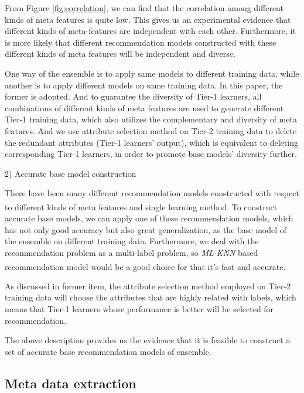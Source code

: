 \documentclass[review,3p,twocolumn,times]{elsarticle}
\newcommand{\upcite}[1]{\textsuperscript{\cite{#1}}}
\begin{document}
From Figure \ref{fig:correlation}, we can find that the correlation among different kinds of meta features is quite low. This gives us an experimental evidence that different kinds of meta-features are independent with each other. Furthermore, it is more likely that different recommendation models constructed with these different kinds of meta features will be independent and diverse.

One way of the ensemble is to apply same models to different training data, while another is to apply different models on same training data. In this paper, the former is adopted. And to guarantee the diversity of Tier-1 learners, all combinations of different kinds of meta features are used to generate different Tier-1 training data, which also utilizes the complementary and diversity of meta features. And we use attribute selection method on Tier-2 training data to delete the redundant attributes (Tier-1 learners' output), which is equivalent to deleting corresponding Tier-1 learners, in order to promote base models' diversity further. 

2) Accurate base model construction

There have been many different recommendation models constructed with respect to different kinds of meta features and single learning method\upcite{Ali2006On, Pise2016Algorithm, Yang2017Choosing, Lee2013Automatic, Ali2018A, Wang2014A, Zhu2018A}. To construct accurate base models, we can apply one of these recommendation models, which has not only good accuracy but also great generalization, as the base model of the ensemble on different training data. Furthermore, we deal with the recommendation problem as a multi-label problem, so \emph{ML-KNN} based recommendation model\upcite{Wang2014A} would be a good choice for that it's fast and accurate. 

As discussed in former item, the attribute selection method employed on Tier-2 training data will choose the attributes that are highly related with labels, which means that Tier-1 learners whose performance is better will be selected for recommendation. 

The above description provides us the evidence that it is feasible to construct a set of accurate base recommendation models of ensemble.



\subsection{Meta data extraction}
\label{meta data extraction}
\end{document}
